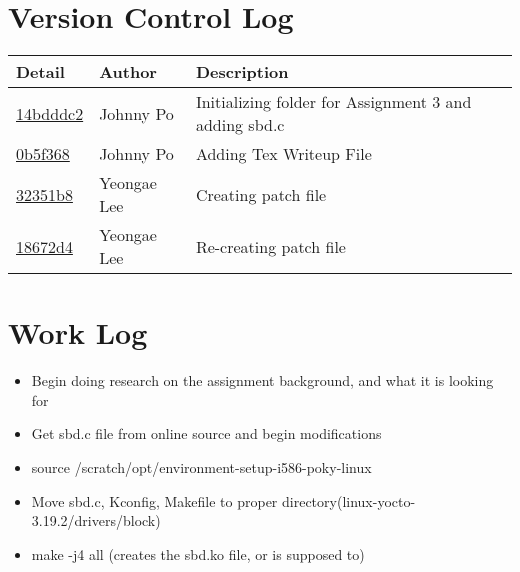 \documentclass[onecolumn, draftclsnofoot,10pt, compsoc]{IEEEtran}
\begin{document}
\section{Version Control Log}
\begin{tabular}{l l l}\textbf{Detail} & \textbf{Author} & \textbf{Description}\\\hline
\href{https://github.com/jawhnypoh/Operating-Systems-II/commit/14bddd290c87a184296eefc095c6dd2ba3256e4a#diff-cdc563e32f1e86ffa25b1fdb325339b1}{14bdddc2} & Johnny Po & Initializing folder for Assignment 3 and adding sbd.c\\\hline
\href{https://github.com/jawhnypoh/Operating-Systems-II/commit/0b5f368176cdb6131b359d5a22a3073f5ab753cd#diff-cdc563e32f1e86ffa25b1fdb325339b1}{0b5f368} & Johnny Po & Adding Tex Writeup File\\\hline 

\href{https://github.com/jawhnypoh/Operating-Systems-II/commit/32351b864824705663de1876d36a2f5b328c2ecb}{32351b8}& Yeongae Lee & Creating patch file\\\hline 

\href{https://github.com/jawhnypoh/Operating-Systems-II/commit/18672d4f9a97619428c6871acb6bf42fb8a4da1a}{18672d4}& Yeongae Lee & Re-creating patch file\\\hline 



\end{tabular}

\section{Work Log}
\begin{itemize}
\item Begin doing research on the assignment background, and what it is looking for 
\item Get sbd.c file from online source and begin modifications
\item source /scratch/opt/environment-setup-i586-poky-linux
\item Move sbd.c, Kconfig, Makefile to proper directory(linux-yocto-3.19.2/drivers/block) 
\item make -j4 all (creates the sbd.ko file, or is supposed to)
\end{itemize}





\clearpage
\end{document}
